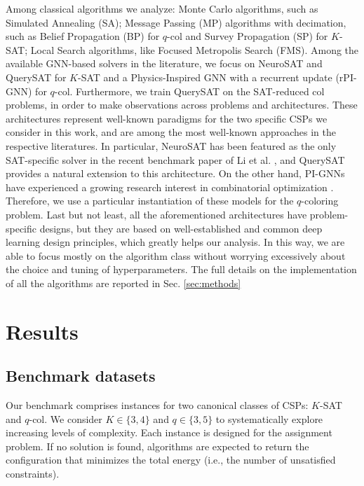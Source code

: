 \documentclass{article}
\begin{document}
Among classical algorithms we analyze: Monte Carlo algorithms, such as Simulated Annealing (SA); Message Passing (MP) algorithms with decimation, such as Belief Propagation (BP) for $q$-col and Survey Propagation (SP) for $K$-SAT; Local Search algorithms, like Focused Metropolis Search (FMS). Among the available GNN-based solvers in the literature, we focus on NeuroSAT and QuerySAT \cite{selsam_learning_2019,ozolins2022goal} for $K$-SAT and a Physics-Inspired GNN \cite{Schuetz_PIGNNcol_2022} with a recurrent update (rPI-GNN) for $q$-col. Furthermore, we train QuerySAT on the SAT-reduced col problems, in order to make  observations across problems and architectures. 
These architectures represent well-known paradigms for the two specific CSPs we consider in this work, and are among the most well-known approaches in the respective literatures. In particular, NeuroSAT has been featured as the only SAT-specific solver in the recent benchmark paper of Li et al. \cite{li_g4satbench_2023}, and QuerySAT provides a natural extension to this architecture. On the other hand, PI-GNNs have experienced a growing research interest in combinatorial optimization \cite{schuetz2022combinatorial}. Therefore, we use a particular instantiation of these models for the $q$-coloring problem. Last but not least, all the aforementioned architectures have problem-specific designs, but they are based on well-established and common deep learning design principles, which greatly helps our analysis. In this way, we are able to focus mostly on the algorithm class without worrying excessively about the choice and tuning of hyperparameters. The full details on the implementation of all the algorithms are reported in Sec. \ref{sec:methods}

\section{Results}

\subsection{Benchmark datasets}\label{sec:main-datasets}

Our benchmark comprises instances for two canonical classes of CSPs: $K$-SAT and $q$-col. We consider $K \in \{3, 4\}$ and $q \in \{3, 5\}$ to systematically explore increasing levels of complexity. Each instance is designed for the assignment problem. If no solution is found, algorithms are expected to return the configuration that minimizes the total energy (i.e., the number of unsatisfied constraints).
\end{document}
